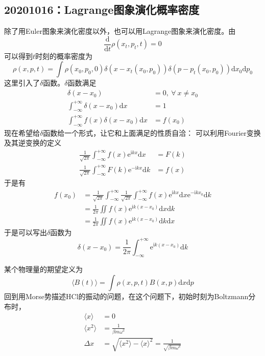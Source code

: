     \subsection{20201016：Lagrange图象演化概率密度}
    除了用Euler图象来演化密度以外，也可以用Lagrange图象来演化密度。由
    \begin{equation*}
        \frac {\mathrm{d}}{\mathrm{d}t} \rho(x_t,p_t,t) = 0
    \end{equation*}
    可以得到$t$时刻的概率密度为
    \begin{equation*}
        \rho(x,p,t) = \int \rho(x_0,p_0,0)\delta(x-x_t(x_0,p_0)) \delta(p-p_t(x_0,p_0)) \mathrm{d}x_0\mathrm{d}p_0
    \end{equation*}
    这里引入了$\delta$函数。$\delta$函数满足
    \begin{align*}
        \delta(x-x_0) &= 0, \ \forall \ x \neq x_0\\
        \int_{-\infty}^{+\infty} \delta(x-x_0) \mathrm{d}x &= 1\\
        \int_{-\infty}^{+\infty} f(x)\delta(x-x_0) \mathrm{d}x &= f(x_0)
    \end{align*}
    现在希望给$\delta$函数给一个形式，让它和上面满足的性质自洽：
    可以利用Fourier变换及其逆变换的定义
    \begin{align*}
        \frac 1{\sqrt{2\pi}} \int_{-\infty}^{+\infty} f(x)\mathrm{e}^{\mathrm{i}kx}\mathrm{d}x &= F(k)\\
        \frac 1{\sqrt{2\pi}} \int_{-\infty}^{+\infty} F(k)\mathrm{e}^{-\mathrm{i}kx}\mathrm{d}k &= f(x)
    \end{align*}
    于是有
    \begin{align*}
        f(x_0) &= \frac 1{\sqrt{2\pi}} \int_{-\infty}^{+\infty} \frac 1{\sqrt{2\pi}} \int_{-\infty}^{+\infty} f(x)\mathrm{e}^{\mathrm{i}kx}\mathrm{d}x \mathrm{e}^{-\mathrm{i}kx_0}\mathrm{d}k\\
        &= \frac 1{2\pi} \iint f(x)\mathrm{e}^{\mathrm{i}k(x-x_0)}\mathrm{d}x\mathrm{d}k\\
        &= \frac 1{2\pi} \iint f(x)\mathrm{e}^{\mathrm{i}k(x-x_0)}\mathrm{d}k\mathrm{d}x
    \end{align*}
    于是可以写出$\delta$函数为
    \begin{equation*}
        \delta(x-x_0) = \frac 1{2\pi} \int_{-\infty}^{+\infty} \mathrm{e}^{\mathrm{i}k(x-x_0)}\mathrm{d}k
    \end{equation*}

    某个物理量的期望定义为
    \begin{equation*}
        \langle B(t) \rangle = \int \rho(x,p,t) B(x,p) \mathrm{d}x\mathrm{d}p
    \end{equation*}
    回到用Morse势描述HCl的振动的问题，在这个问题下，初始时刻为Boltzmann分布时，
    \begin{align*}
        \langle x \rangle &= 0\\
        \langle x^2 \rangle &= \frac 1{\beta m \omega^2}\\
        \Delta x &= \sqrt{\langle x^2 \rangle - \langle x \rangle ^2} = \frac 1{\sqrt{\beta m \omega^2}}
    \end{align*}

